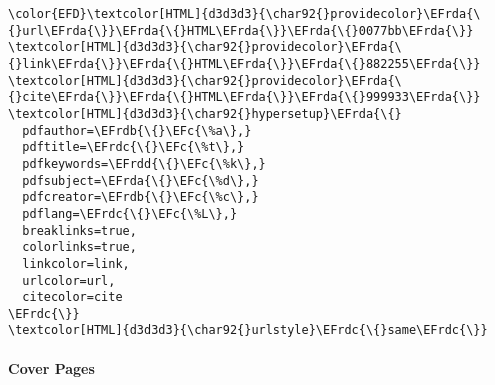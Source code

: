 \documentclass{article}
\newcommand{\EFc}[1]{\textcolor{EFc}{#1}} %
\newcommand{\EFrda}[1]{\textcolor{EFrda}{#1}} %
\newcommand{\EFrdb}[1]{\textcolor{EFrdb}{#1}} %
\newcommand{\EFrdc}[1]{\textcolor{EFrdc}{#1}} %
\newcommand{\EFrdd}[1]{\textcolor{EFrdd}{#1}} %
\begin{document}
\begin{Code}
\begin{Verbatim}
\color{EFD}\textcolor[HTML]{d3d3d3}{\char92{}providecolor}\EFrda{\{}url\EFrda{\}}\EFrda{\{}HTML\EFrda{\}}\EFrda{\{}0077bb\EFrda{\}}
\textcolor[HTML]{d3d3d3}{\char92{}providecolor}\EFrda{\{}link\EFrda{\}}\EFrda{\{}HTML\EFrda{\}}\EFrda{\{}882255\EFrda{\}}
\textcolor[HTML]{d3d3d3}{\char92{}providecolor}\EFrda{\{}cite\EFrda{\}}\EFrda{\{}HTML\EFrda{\}}\EFrda{\{}999933\EFrda{\}}
\textcolor[HTML]{d3d3d3}{\char92{}hypersetup}\EFrda{\{}
  pdfauthor=\EFrdb{\{}\EFc{\%a\},}
  pdftitle=\EFrdc{\{}\EFc{\%t\},}
  pdfkeywords=\EFrdd{\{}\EFc{\%k\},}
  pdfsubject=\EFrda{\{}\EFc{\%d\},}
  pdfcreator=\EFrdb{\{}\EFc{\%c\},}
  pdflang=\EFrdc{\{}\EFc{\%L\},}
  breaklinks=true,
  colorlinks=true,
  linkcolor=link,
  urlcolor=url,
  citecolor=cite
\EFrdc{\}}
\textcolor[HTML]{d3d3d3}{\char92{}urlstyle}\EFrdc{\{}same\EFrdc{\}}
\end{Verbatim}
\end{Code}



\paragraph{Cover Pages}
\label{sec:org13909c6}
\end{document}
